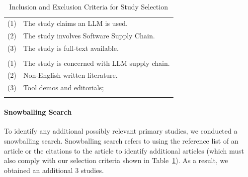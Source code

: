 \begin{table}[ht]
  \centering
  \caption{Inclusion and Exclusion Criteria for Study Selection}
  \label{tab:criteria}
\begin{tabular}{ll}
\thickhline
\multicolumn{2}{c}{\textbf{Inclusion Criteria}} \\ \hline
    (1) & The study claims an LLM is used. \\
    (2) & The study involves Software Supply Chain. \\
    (3) & The study is full-text available. \\
\thickhline
\multicolumn{2}{c}{\textbf{Exclusion Criteria}} \\ \hline
    (1) & The study is concerned with LLM supply chain. \\
    (2) & Non-English written literature. \\
    (3) & Tool demos and editorials; \\
\thickhline
\thickhline
\end{tabular}
\end{table}

\paragraph*{Snowballing Search}
To identify any additional 
 possibly relevant primary studies, we conducted a snowballing 
 search. Snowballing search refers to using the reference list
 of an article or the citations to the article to identify additional
 articles (which must also comply with our
 selection criteria shown in Table~\ref{tab:criteria}). 
As a result, we obtained an additional 3 studies.
